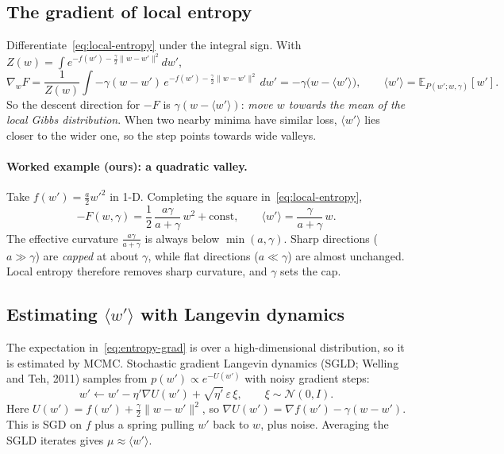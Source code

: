 \documentclass[11pt]{article}
\newcommand{\E}{\mathbb{E}}
\newcommand{\N}{\mathcal{N}}
\theoremstyle{plain}
\begin{document}
\subsection{The gradient of local entropy}

Differentiate~\eqref{eq:local-entropy} under the integral sign. With $Z(w) = \int e^{-f(w') - \frac{\gamma}{2}\|w-w'\|^2} dw'$,
\begin{equation}
  \nabla_w F = \frac{1}{Z(w)} \int -\gamma (w - w')\, e^{-f(w') - \frac{\gamma}{2}\|w-w'\|^2}\, dw'
            = -\gamma\big(w - \langle w' \rangle\big),
  \qquad \langle w' \rangle = \E_{P(w';w,\gamma)}[w'] .
  \label{eq:entropy-grad}
\end{equation}
So the descent direction for $-F$ is $\gamma(w - \langle w'\rangle)$: \emph{move $w$ towards the mean of the local Gibbs distribution}.
When two nearby minima have similar loss, $\langle w'\rangle$ lies closer to the wider one, so the step points towards wide valleys.

\paragraph{Worked example (ours): a quadratic valley.} Take $f(w') = \frac{a}{2} w'^2$ in 1-D. Completing the square in~\eqref{eq:local-entropy},
\begin{equation}
  -F(w,\gamma) = \frac12\,\frac{a\gamma}{a+\gamma}\, w^2 + \text{const},
  \qquad \langle w'\rangle = \frac{\gamma}{a+\gamma}\, w .
\end{equation}
The effective curvature $\frac{a\gamma}{a+\gamma}$ is always below $\min(a,\gamma)$. Sharp directions ($a \gg \gamma$) are \emph{capped} at about $\gamma$,
while flat directions ($a \ll \gamma$) are almost unchanged. Local entropy therefore removes sharp curvature, and $\gamma$ sets the cap.

\subsection{Estimating $\langle w'\rangle$ with Langevin dynamics}

The expectation in~\eqref{eq:entropy-grad} is over a high-dimensional distribution, so it is estimated by MCMC.
Stochastic gradient Langevin dynamics (SGLD; Welling and Teh, 2011) samples from $p(w') \propto e^{-U(w')}$ with noisy gradient steps:
\begin{equation}
  w' \leftarrow w' - \eta' \nabla U(w') + \sqrt{\eta'}\,\varepsilon\, \xi, \qquad \xi\sim\N(0,I).
\end{equation}
Here $U(w') = f(w') + \frac{\gamma}{2}\|w-w'\|^2$, so $\nabla U(w') = \nabla f(w') - \gamma(w - w')$. This is SGD on $f$ plus a spring pulling
$w'$ back to $w$, plus noise. Averaging the SGLD iterates gives $\mu \approx \langle w'\rangle$.
\end{document}
